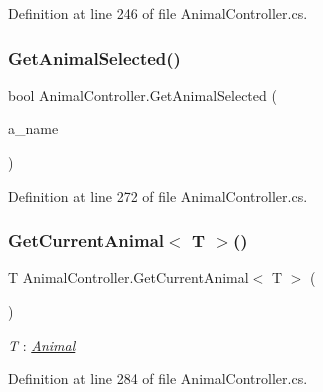 Definition at line 246 of file Animal\+Controller.\+cs.

\mbox{\label{class_animal_controller_a778b5b9ede6ee38c4368d0707f9f2b7d}} 
\subsubsection{\texorpdfstring{Get\+Animal\+Selected()}{GetAnimalSelected()}}
{\footnotesize\ttfamily bool Animal\+Controller.\+Get\+Animal\+Selected (\begin{DoxyParamCaption}\item[{\mbox{\hyperlink{_animal_8cs_a2fa5713399b84d1b88dae9196837af50}{A\+N\+I\+M\+A\+L\+\_\+\+N\+A\+ME}}}]{a\+\_\+name }\end{DoxyParamCaption})}



Definition at line 272 of file Animal\+Controller.\+cs.

\mbox{\label{class_animal_controller_a1463a70fbd663135c7fdd291e81f5950}} 
\subsubsection{\texorpdfstring{Get\+Current\+Animal$<$ T $>$()}{GetCurrentAnimal< T >()}}
{\footnotesize\ttfamily T Animal\+Controller.\+Get\+Current\+Animal$<$ T $>$ (\begin{DoxyParamCaption}{ }\end{DoxyParamCaption})}

\begin{Desc}
\item[Type Constraints]\begin{description}
\item[{\em T} : {\em \mbox{\hyperlink{class_animal}{Animal}}}]\end{description}
\end{Desc}


Definition at line 284 of file Animal\+Controller.\+cs.

